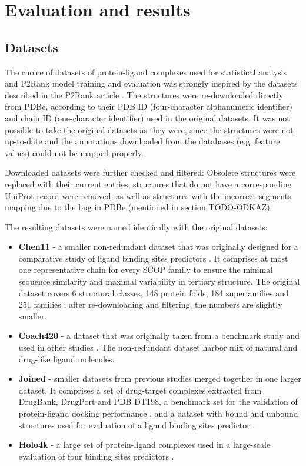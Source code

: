 \chapter{Evaluation and results}


\section{Datasets}


The choice of datasets of protein-ligand complexes used for statistical analysis and P2Rank model training and evaluation was strongly inspired by the datasets described in the P2Rank article \cite{p2rank1}. The structures were re-downloaded directly from PDBe, according to their PDB ID (four-character alphanumeric identifier) and chain ID (one-character identifier) used in the original datasets. It was not possible to take the original datasets as they were, since the structures were not up-to-date and the annotations downloaded from the databases (e.g. feature values) could not be mapped properly.

Downloaded datasets were further checked and filtered: Obsolete structures were replaced with their current entries, structures that do not have a corresponding UniProt record were removed, as well as  structures with the incorrect segments mapping due to the bug in PDBe (mentioned in section TODO-ODKAZ).


The resulting datasets were named identically with the original datasets:

\begin{itemize}
  \item \textbf{Chen11}
  - a smaller non-redundant dataset that was originally designed for a comparative study of ligand binding sites predictors \cite{benchmark}. It comprises at most one representative chain for every SCOP family \cite{scop} to ensure the minimal sequence similarity and maximal variability in tertiary structure. The original dataset covers 6 structural classes, 148 protein folds, 184 superfamilies and 251 families \cite{benchmark}; after re-downloading and filtering, the numbers are slightly smaller.
  
  \item \textbf{Coach420}
  - a dataset that was originally taken from a benchmark study \cite{cofactor} and used in other studies \cite{coach, p2rank1}. The non-redundant dataset harbor mix of natural and drug-like ligand molecules.
  
  \item \textbf{Joined}
  - smaller datasets from previous studies merged together in one larger dataset. It comprises a set of drug-target complexes extracted from DrugBank, DrugPort and PDB DT198\cite{dt}, a benchmark set for the validation of protein-ligand docking performance \cite{astex}, and a dataset with bound and unbound structures used for evaluation of a ligand binding sites predictor \cite{ligsite}.
  
  \item \textbf{Holo4k}
  - a large set of protein-ligand complexes used in a large-scale evaluation of four binding sites predictors \cite{holo4k}.
\end{itemize}



